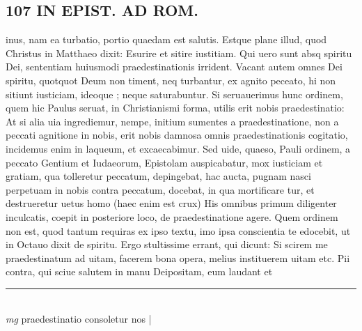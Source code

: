 \documentclass{article}
\begin{document}
\begin{pages}
\section*{107 IN EPIST. AD ROM.  }
\marginpar{[ p.]}\pstart inus, nam ea turbatio, portio quaedam est salutis.  Estque plane illud, quod Christus in Matthaeo dixit: Esurire et sitire iustitiam. Qui uero sunt absq spiritu Dei, sententiam huiusmodi praedestinationis irrident. Vacant autem omnes Dei spiritu, quotquot Deum non timent, neq turbantur, ex agnito peceato, hi non sitiunt iusticiam, ideoque ; neque saturabuntur.  Si seruauerimus hunc ordinem, quem hic Paulus seruat, in Christianismi forma, utilis erit nobis praedestinatio: At si alia uia ingrediemur, nempe, initium sumentes a praedestinatione, non a peccati agnitione in nobis, erit nobis damnosa omnis praedestinationis cogitatio, incidemus enim in laqueum, et excaecabimur. Sed uide, quaeso, Pauli ordinem, a peccato Gentium et Iudaeorum, Epistolam auspicabatur, mox iusticiam et gratiam, qua tolleretur peccatum, depingebat, hac aucta, pugnam nasci perpetuam in nobis contra peccatum, docebat, in qua mortificare tur, et destrueretur uetus homo (haec enim est crux) His omnibus primum diligenter inculcatis, coepit in posteriore loco, de praedestinatione agere. Quem ordinem non est, quod tantum requiras ex ipso textu, imo ipsa conscientia te edocebit, ut in Octauo dixit de spiritu. Ergo stultissime errant, qui dicunt: Si scirem me praedestinatum ad uitam, facerem bona opera, melius instituerem uitam etc. Pii contra, qui sciue salutem in manu Deipositam, eum laudant et  \pend
\vspace{0.5cm}\noindent
\vspace{0.2cm}\rule{1cm}{0.2pt}\\ 
\hspace{0.2cm}\textit{mg}
\footnotesize praedestinatio consoletur nos 
\normalsize| 

\end{pages}
\end{document}
